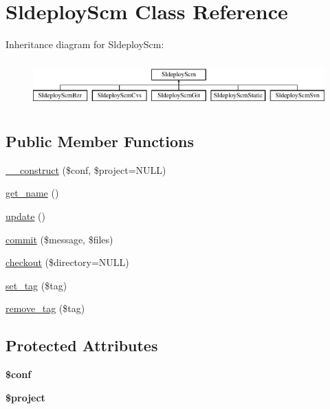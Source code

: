 \hypertarget{class_sldeploy_scm}{
\section{SldeployScm Class Reference}
\label{class_sldeploy_scm}
}
Inheritance diagram for SldeployScm:\begin{figure}[H]
\begin{center}
\leavevmode
\includegraphics[height=1.806452cm]{class_sldeploy_scm}
\end{center}
\end{figure}
\subsection*{Public Member Functions}
\begin{DoxyCompactItemize}
\item 
\hyperlink{class_sldeploy_scm_a06661c2e25db6f16ef0b38682eada9ef}{\_\-\_\-construct} (\$conf, \$project=NULL)
\item 
\hyperlink{class_sldeploy_scm_a4f1149ccbd69d1ac4225b7bc2dd871bb}{get\_\-name} ()
\item 
\hyperlink{class_sldeploy_scm_a842e4774e3b3601a005b995c02f7e883}{update} ()
\item 
\hyperlink{class_sldeploy_scm_a7e5dae457f58f6421a54500382dfa9a5}{commit} (\$message, \$files)
\item 
\hyperlink{class_sldeploy_scm_a9ba6cf7361158e3f1394138c8a2535a1}{checkout} (\$directory=NULL)
\item 
\hyperlink{class_sldeploy_scm_adb075df402c69bc1ca52b0b4d10bd729}{set\_\-tag} (\$tag)
\item 
\hyperlink{class_sldeploy_scm_acc936030ab582aeb7fc59d05e316af7f}{remove\_\-tag} (\$tag)
\end{DoxyCompactItemize}
\subsection*{Protected Attributes}
\begin{DoxyCompactItemize}
\item 
\hypertarget{class_sldeploy_scm_ae4901046cc3e1deebf77ccc785384a78}{
{\bfseries \$conf}}
\label{class_sldeploy_scm_ae4901046cc3e1deebf77ccc785384a78}

\item 
\hypertarget{class_sldeploy_scm_a26a7d69cd5cc291d752925dd312b5d1c}{
{\bfseries \$project}}
\label{class_sldeploy_scm_a26a7d69cd5cc291d752925dd312b5d1c}

\end{DoxyCompactItemize}


